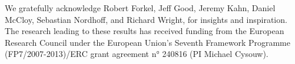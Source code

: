 \begin{refsection}

We gratefully acknowledge Robert Forkel, Jeff Good, Jeremy Kahn, Daniel McCloy, Sebastian Nordhoff, and Richard Wright, for insights and inspiration. The research leading to these results has received funding from the European Research Council under the European Union's Seventh Framework Programme (FP7/2007-2013)/ERC grant agreement n° 240816 (PI Michael Cysouw).

\printbibliography[heading=subbibliography]
\end{refsection}

